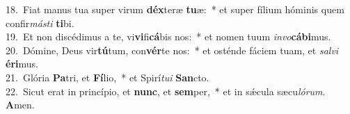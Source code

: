 {18.~}Fiat manus tua super virum \textbf{déx}teræ \textbf{tu}æ:~* et super fílium hóminis quem confir\textit{má}\textit{sti} \textbf{ti}bi.\\
{19.~}Et non discédimus a te, vi\textbf{vi}fi\textbf{cá}bis nos:~* et nomen tuum \textit{in}\textit{vo}\textbf{cá}\textbf{bi}mus.\\
{20.~}Dómine, Deus vir\textbf{tú}tum, con\textbf{vér}te nos:~* et osténde fáciem tuam, et \textit{sal}\textit{vi} \textbf{é}\textbf{ri}mus.\\
{21.~}Glória \textbf{Pa}tri, et \textbf{Fí}lio,~* et Spirí\textit{tu}\textit{i} \textbf{San}cto.\\
{22.~}Sicut erat in princípio, et \textbf{nunc}, et \textbf{sem}per,~* et in sǽcula sæcu\textit{ló}\textit{rum}. \textbf{A}men.\\
